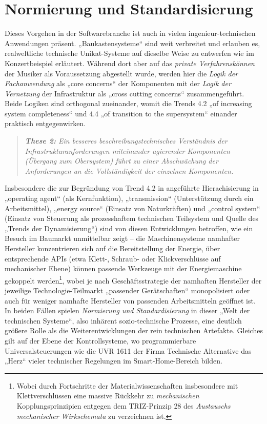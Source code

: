 \documentclass[12pt,a4paper]{article}
\begin{document}
\section{Normierung und Standardisierung}

Dieses Vorgehen in der Softwarebranche ist auch in vielen
ingenieur-technischen Anwendungen präsent. „Baukastensysteme“ sind weit
verbreitet und erlauben es, realweltliche technische Unikat-Systeme auf
dieselbe Weise zu entwerfen wie im Konzertbeispiel erläutert. Während dort
aber auf das \emph{private Verfahrenskönnen} der Musiker als Voraussetzung
abgestellt wurde, werden hier die \emph{Logik der Fachanwendung} als „core
concerns“ der Komponenten mit der \emph{Logik der Vernetzung} der
Infrastruktur als „cross cutting concerns“ zusammengeführt. Beide Logiken sind
orthogonal zueinander, womit die Trends 4.2 „of increasing system
completeness“ und 4.4 „of transition to the supersystem“ einander praktisch
entgegenwirken. 
\begin{quote}\it 
  \textbf{These 2:} Ein besseres beschreibungstechnisches Verständnis der
  Infrastrukturanforderungen miteinander agierender Komponenten (Übergang zum
  Obersystem) führt zu einer \emph{Abschwächung} der Anforderungen an die
  Vollständigkeit der einzelnen Komponenten.
\end{quote}
Insbesondere die zur Begründung von Trend 4.2 in \cite{TESE2018} angeführte
Hierachisierung in „operating agent“ (als Kernfunktion), „transmission“
(Unterstützung durch ein Arbeitsmittel), „energy source“ (Einsatz von
Naturkräften) und „control system“ (Einsatz von Steuerung als prozesshaftem
technischen Teilsystem und Quelle des „Trends der Dynamisierung“) sind von
diesen Entwicklungen betroffen, wie ein Besuch im Baumarkt unmittelbar zeigt
-- die Maschinensysteme namhafter Hersteller konzentrieren sich auf die
Bereitstellung der Energie, über entsprechende APIs (etwa Klett-, Schraub-
oder Klickverschlüsse auf mechanischer Ebene) können passende Werkzeuge mit
der Energiemaschine gekoppelt werden\footnote{Wobei durch Fortschritte der
  Materialwissenschaften insbesondere mit Klettverschlüssen eine massive
  Rückkehr zu \emph{mechanischen} Kopplungsprinzipien entgegen dem
  TRIZ-Prinzip 28 des \emph{Austauschs mechanischer Wirkschemata} zu
  verzeichnen ist.}, wobei je nach Geschäftsstrategie der namhaften Hersteller
der jeweilige Technologie-Teilmarkt „passender Gerätschaften“ monopolisiert
oder auch für weniger namhafte Hersteller von passenden Arbeitsmitteln
geöffnet ist. In beiden Fällen spielen \emph{Normierung und Standardisierung}
in dieser „Welt der technischen Systeme“, also inhärent sozio-technische
Prozesse, eine deutlich größere Rolle als die Weiterentwicklungen der rein
technischen Artefakte. Gleiches gilt auf der Ebene der Kontrollsysteme, wo
programmierbare Universalsteuerungen wie die UVR 1611 der Firma Technische
Alternative das „Herz“ vieler technischer Regelungen im Smart-Home-Bereich
bilden.
\end{document}
